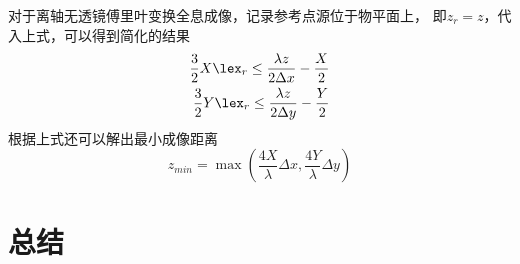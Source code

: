 \documentclass[11pt,a4paper]{article}
\begin{document}
对于离轴无透镜傅里叶变换全息成像，记录参考点源位于物平面上，
即$z_r=z$，代入上式，可以得到简化的结果
\begin{equation}
\begin{split}
\frac{3}{2}X\lex_r\le\frac{\lambda z}{2\Delta x} - \frac{X}{2} \\
\frac{3}{2}Y\lex_r\le\frac{\lambda z}{2\Delta y} - \frac{Y}{2} 
\end{split}
\end{equation}
根据上式还可以解出最小成像距离
\begin{equation}
z_{min} = \max(\frac{4X}{\lambda}\Delta x, \frac{4Y}{\lambda} \Delta y )
\end{equation}
\section{总结}




\end{document}
